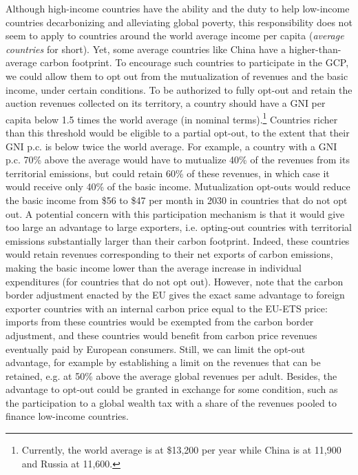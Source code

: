 \documentclass[12pt,english]{article}
\begin{document}
Although high-income countries have the ability and the duty to help low-income countries decarbonizing and alleviating global poverty, this responsibility does not seem to apply to countries around the world average income per capita (\textit{average countries} for short). Yet, some average countries like China have a higher-than-average carbon footprint. To encourage such countries to participate in the GCP, we could allow them to opt out from the mutualization of revenues and the basic income, under certain conditions. To be authorized to fully opt-out and retain the auction revenues collected on its territory, a country should have a GNI per capita below 1.5 times 
the world average (in nominal terms).\footnote{Currently, the world average is at \$13,200 per year while China is at 11,900 and Russia at 11,600.} Countries richer than this threshold %
would be eligible to a partial opt-out, to the extent that their GNI p.c. is below twice the world average. For example, a country with a GNI p.c. 70\% above the average would have to mutualize 40\% of the revenues from its territorial emissions, but could retain 60\% of these revenues, in which case it would receive only 40\% of the basic income. Mutualization opt-outs would reduce the basic income from \$56 to \$47 per month in 2030 in countries that do not opt out. 
A potential concern with this participation mechanism is that it would give too large an advantage to large exporters, i.e. opting-out countries with territorial emissions substantially larger than their carbon footprint. Indeed, these countries would retain revenues corresponding to their net exports of carbon emissions, making the basic income lower than the average increase in individual expenditures (for countries that do not opt out). However, note that the carbon border adjustment enacted by the EU gives the exact same advantage to foreign exporter countries with an internal carbon price equal to the EU-ETS price: imports from these countries would be exempted from the carbon border adjustment, and these countries would benefit from carbon price revenues eventually paid by European consumers. Still, we can limit the opt-out advantage, for example by establishing a limit on the revenues that can be retained, e.g. at 50\% above the average global revenues per adult. %
Besides, the advantage to opt-out could be granted in exchange for some condition, such as the participation to a global wealth tax with a share of the revenues pooled to finance low-income countries. %
\end{document}

